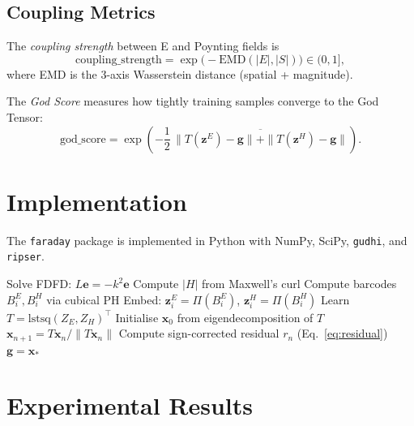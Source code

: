 \documentclass[11pt,twocolumn]{article}
\begin{document}
\subsection{Coupling Metrics}

The \emph{coupling strength} between E and Poynting fields is
\begin{equation}
\mathrm{coupling\_strength} = \exp\bigl(-\mathrm{EMD}(|E|, |S|)\bigr) \in (0, 1],
\end{equation}
where EMD is the 3-axis Wasserstein distance (spatial + magnitude).

The \emph{God Score} measures how tightly training samples converge to
the God Tensor:
\begin{equation}
\mathrm{god\_score} = \exp\!\left(-\frac{1}{2}\,
\overline{\|T(\mathbf{z}^E) - \mathbf{g}\| + \|T(\mathbf{z}^H) - \mathbf{g}\|}\right).
\end{equation}

\section{Implementation}
\label{sec:impl}

The \texttt{faraday} package is implemented in Python with NumPy, SciPy,
\texttt{gudhi}, and \texttt{ripser}.

\begin{algorithm}[h]
\caption{God Tensor Training Pipeline}
\begin{algorithmic}[1]
  \STATE Solve FDFD: $L\mathbf{e} = -k^2\mathbf{e}$
  \STATE Compute $|H|$ from Maxwell's curl
  \STATE Compute barcodes $B^E_i, B^H_i$ via cubical PH
  \STATE Embed: $\mathbf{z}^E_i = \Pi(B^E_i)$, $\mathbf{z}^H_i = \Pi(B^H_i)$
\ENDFOR
\STATE Learn $T = \mathrm{lstsq}(Z_E, Z_H)^\top$
\STATE Initialise $\mathbf{x}_0$ from eigendecomposition of $T$
  \STATE $\mathbf{x}_{n+1} = T\mathbf{x}_n / \|T\mathbf{x}_n\|$
  \STATE Compute sign-corrected residual $r_n$ (Eq.~\ref{eq:residual})
\ENDWHILE
\RETURN $\mathbf{g} = \mathbf{x}_*$
\end{algorithmic}
\end{algorithm}

\section{Experimental Results}
\label{sec:results}
\end{document}
